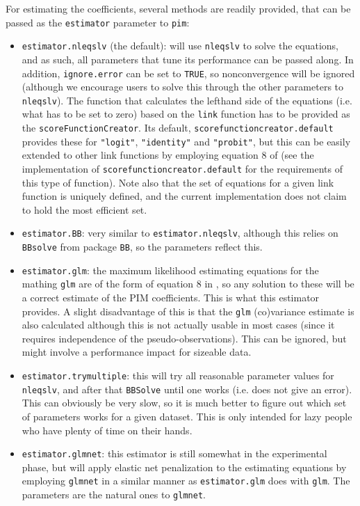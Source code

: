 \documentclass[12pt]{article}
\newcommand{\pim}[1]{\texttt{#1}}%
\newcommand{\cd}[1]{\texttt{#1}}%
\begin{document}
For estimating the coefficients, several methods are readily provided, that can be passed as the \cd{estimator} parameter to \pim{pim}:
\begin{itemize}
	\item \pim{estimator.nleqslv} (the default): will use \cd{nleqslv} to solve the equations, and as such, all parameters that tune its performance can be passed along. In addition, \cd{ignore.error} can be set to \cd{TRUE}, so nonconvergence will be ignored (although we encourage users to solve this through the other parameters to \cd{nleqslv}). The function that calculates the lefthand side of the equations (i.e. what has to be set to zero) based on the \cd{link} function has to be provided as the \cd{scoreFunctionCreator}. Its default, \pim{scorefunctioncreator.default} provides these for \cd{"logit"}, \cd{"identity"} and \cd{"probit"}, but this can be easily extended to other link functions by employing equation 8 of \cite{Thas2012} (see the implementation of \cd{scorefunctioncreator.default} for the requirements of this type of function). Note also that the set of equations for a given link function is uniquely defined, and the current implementation does not claim to hold the most efficient set.
	\item \pim{estimator.BB}: very similar to \cd{estimator.nleqslv}, although this relies on \cd{BBsolve} from package \cd{BB}, so the parameters reflect this.
	\item \pim{estimator.glm}: the maximum likelihood estimating equations for the mathing \cd{glm} are of the form of equation 8 in \cite{Thas2012}, so any solution to these will be a correct estimate of the PIM coefficients. This is what this estimator provides. A slight disadvantage of this is that the \cd{glm} (co)variance estimate is also calculated although this is not actually usable in most cases (since it requires independence of the pseudo-observations). This can be ignored, but might involve a performance impact for sizeable data.
	\item \pim{estimator.trymultiple}: this will try all reasonable parameter values for \cd{nleqslv}, and after that \cd{BBSolve} until one works (i.e. does not give an error). This can obviously be very slow, so it is much better to figure out which set of parameters works for a given dataset. This is only intended for lazy people who have plenty of time on their hands.
	\item \pim{estimator.glmnet}: this estimator is still somewhat in the experimental phase, but will apply elastic net penalization to the estimating equations by employing \cd{glmnet} in a similar manner as \pim{estimator.glm} does with \cd{glm}. The parameters are the natural ones to \cd{glmnet}.
\end{itemize}
\end{document}
